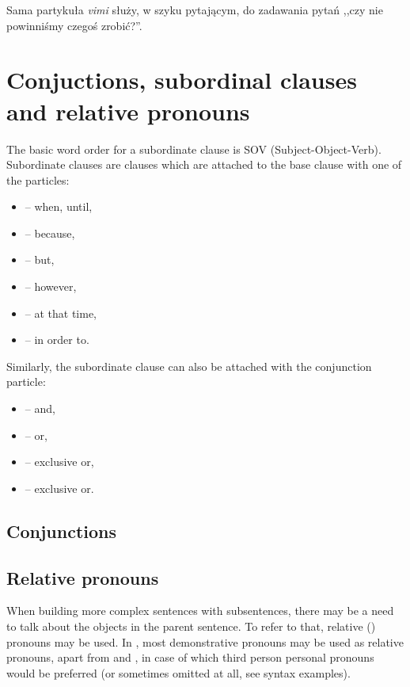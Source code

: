 Sama partykuła \emph{vimi} służy, w szyku pytającym, do zadawania pytań ,,czy
nie powinniśmy czegoś zrobić?''.


\section{Conjuctions, subordinal clauses and relative pronouns}
\label{sec:conjunctions}

The basic word order for a subordinate clause is SOV (Subject-Object-Verb).
Subordinate clauses are clauses which are attached to the base clause with one
of the particles:

\begin{itemize}
    \item {} -- when, until,
    \item {} -- because,
    \item {} -- but,
    \item {} -- however,
    \item {} -- at that time,
    \item {} -- in order to.
\end{itemize}

Similarly, the subordinate clause can also be attached with the conjunction
particle:

\begin{itemize}
    \item {} -- and,
    \item {} -- or,
    \item {} -- exclusive or,
    \item {} -- exclusive or.
\end{itemize}

\subsection{Conjunctions}




\subsection{Relative pronouns}
When building more complex sentences with subsentences, there may be a need to
talk about the objects in the parent sentence. To refer to that, relative
(\Rel{}) pronouns may be used. In \andro, most demonstrative pronouns may be
used as relative pronouns, apart from  and , in case of
which third person personal pronouns would be preferred (or sometimes omitted at
all, see syntax examples).

